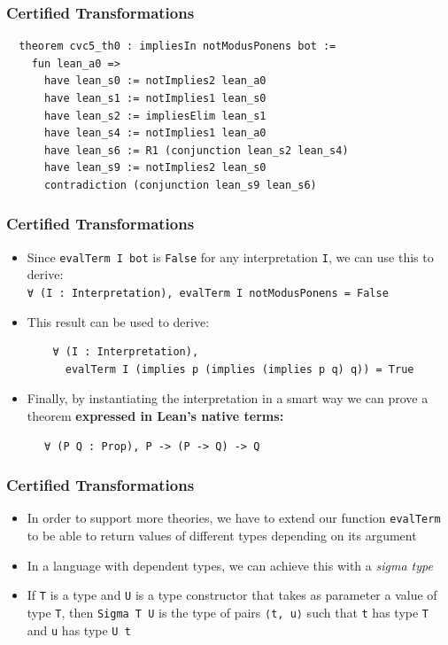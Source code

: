 \documentclass[usepdftitle=false,aspectratio=169,usenames,dvipsnames]{beamer}
\newcommand\vitem{\vfill\item}
\begin{document}
\begin{frame}[fragile]
  \frametitle{Certified Transformations}
  \begin{verbatim}
  theorem cvc5_th0 : impliesIn notModusPonens bot :=
    fun lean_a0 =>
      have lean_s0 := notImplies2 lean_a0
      have lean_s1 := notImplies1 lean_s0
      have lean_s2 := impliesElim lean_s1
      have lean_s4 := notImplies1 lean_a0
      have lean_s6 := R1 (conjunction lean_s2 lean_s4)
      have lean_s9 := notImplies2 lean_s0
      contradiction (conjunction lean_s9 lean_s6)
  \end{verbatim}
\end{frame}


\begin{frame}[fragile]
  \frametitle{Certified Transformations}
  \begin{itemize}
    \item Since \texttt{evalTerm I bot} is \texttt{False} for any interpretation \texttt{I}, we can use this to derive:\\ \texttt{∀ (I : Interpretation), evalTerm I notModusPonens = False}
    \vitem This result can be used to derive:\\
    \begin{verbatim}
    ∀ (I : Interpretation),
      evalTerm I (implies p (implies (implies p q) q)) = True
    \end{verbatim}
    \vitem Finally, by instantiating the interpretation in a smart way we can prove a theorem \textbf{expressed in Lean's native terms:}
  \end{itemize}
  \vfill
    \begin{verbatim}
      ∀ (P Q : Prop), P -> (P -> Q) -> Q
    \end{verbatim}
\end{frame}

\begin{frame}
  \frametitle{Certified Transformations}
  \begin{itemize}
    \item In order to support more theories, we have to extend our function \texttt{evalTerm} to be able to return values of different types depending on its argument
    \vitem In a language with dependent types, we can achieve this with a \textit{sigma type}
    \vitem If \texttt{T} is a type and \texttt{U} is a type constructor that takes as parameter a value of type \texttt{T}, then \texttt{Sigma T U} is the type of pairs \texttt{⟨t, u⟩} such that \texttt{t} has type \texttt{T} and \texttt{u} has type \texttt{U t}
  \end{itemize}
\end{frame}
\end{document}
